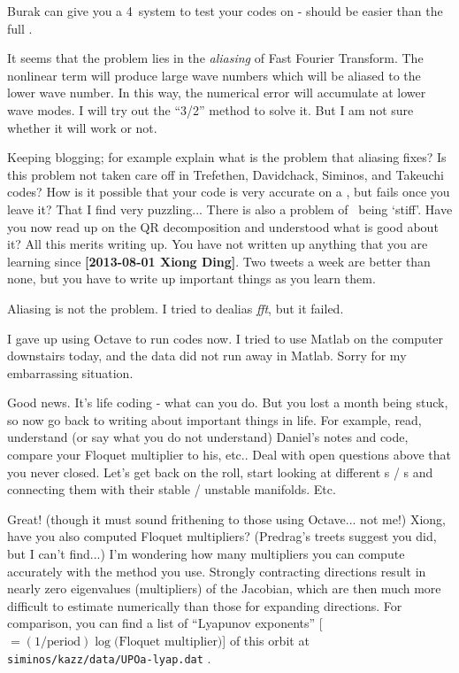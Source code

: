 \begin{description}
Burak can give you a 4\dmn\ system to test your codes on - should be
easier than the full \KS.

\item[2013-08-27 Xiong Ding]
It seems that the problem lies in the \textit{aliasing} of Fast Fourier
Transform. The nonlinear term will produce large wave numbers which
will be aliased to the lower wave number. In this way, the numerical error
will accumulate at lower wave modes. I will try out the ``3/2''
method to solve it. But I am not sure whether it will work or not.

\item[2013-08-28 Predrag] Keeping blogging; for example explain what
is the problem that aliasing fixes? Is this problem not taken care
off in Trefethen, Davidchack, Siminos, and Takeuchi codes? How is it
possible that your code is very accurate on a \po, but fails once you
leave it? That I find very puzzling... There is also a problem of
\KS\ being `stiff'. Have you now read up on the QR decomposition and
understood what is good about it? All this merits writing up. You
have not written up anything that you are learning since {\bf
[2013-08-01 Xiong Ding]}. Two tweets a week are better than none, but
you have to write up important things as you learn them.

\item[2013-08-28 Xiong Ding]
Aliasing is not the problem. I tried to dealias \textit{fft}, but it failed.

I gave up using Octave to run codes now. I tried to use Matlab on
the computer downstairs today, and the data did not run away in Matlab.
Sorry for my embarrassing situation.

\item[2013-08-28 Predrag] Good news. It's life coding - what can you do.
But you lost a month being stuck, so now go back to writing about important
things in life. For example, read, understand (or say what you do not understand)
Daniel's notes and code, compare your Floquet multiplier to his, etc..
Deal with open questions above that you never closed. Let's
get back on the roll, start looking at different \po s / \rpo s and
connecting them with their stable / unstable manifolds. Etc.

\item[2013-08-30 Kazumasa]
Great! (though it must sound frithening to those using Octave... not me!)
Xiong, have you also computed Floquet multipliers?
(Predrag's treets suggest you did, but I can't find...)
I'm wondering how many multipliers you can compute accurately
 with the method you use.
Strongly contracting directions result in nearly zero eigenvalues (multipliers)
 of the Jacobian, which are then much more difficult
 to estimate numerically than those for expanding directions.
For comparison, you can find a list of ``Lyapunov exponents''
 [$=(1/\text{period})\log\text{(Floquet multiplier)}$] of this orbit at\\
\texttt{siminos/kazz/data/UPOa-lyap.dat} .


\end{description}
